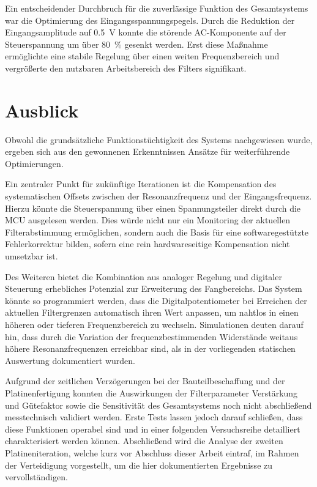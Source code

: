 \documentclass[../main_config.tex]{subfiles}
\begin{document}
Ein entscheidender Durchbruch für die zuverlässige Funktion des Gesamtsystems war die Optimierung des Eingangsspannungspegels. Durch die Reduktion der Eingangsamplitude auf \SI{0,5}{V} konnte die störende AC-Komponente auf der Steuerspannung um über \SI{80}{\percent} gesenkt werden. Erst diese Maßnahme ermöglichte eine stabile Regelung über einen weiten Frequenzbereich und vergrößerte den nutzbaren Arbeitsbereich des Filters signifikant.\par
\medskip



\section{Ausblick}
Obwohl die grundsätzliche Funktionstüchtigkeit des Systems nachgewiesen wurde, ergeben sich aus den gewonnenen Erkenntnissen Ansätze für weiterführende Optimierungen.\par
\medskip

Ein zentraler Punkt für zukünftige Iterationen ist die Kompensation des systematischen Offsets zwischen der Resonanzfrequenz und der Eingangsfrequenz. Hierzu könnte die Steuerspannung über einen Spannungsteiler direkt durch die MCU ausgelesen werden. Dies würde nicht nur ein Monitoring der aktuellen Filterabstimmung ermöglichen, sondern auch die Basis für eine softwaregestützte Fehlerkorrektur bilden, sofern eine rein hardwareseitige Kompensation nicht umsetzbar ist.\par
\medskip

Des Weiteren bietet die Kombination aus analoger Regelung und digitaler Steuerung erhebliches Potenzial zur Erweiterung des Fangbereichs. Das System könnte so programmiert werden, dass die Digitalpotentiometer bei Erreichen der aktuellen Filtergrenzen automatisch ihren Wert anpassen, um nahtlos in einen höheren oder tieferen Frequenzbereich zu wechseln. Simulationen deuten darauf hin, dass durch die Variation der frequenzbestimmenden Widerstände weitaus höhere Resonanzfrequenzen erreichbar sind, als in der vorliegenden statischen Auswertung dokumentiert wurden.\par
\medskip

Aufgrund der zeitlichen Verzögerungen bei der Bauteilbeschaffung und der Platinenfertigung konnten die Auswirkungen der Filterparameter Verstärkung und Gütefaktor sowie die Sensitivität des Gesamtsystems noch nicht abschließend messtechnisch validiert werden. Erste Tests lassen jedoch darauf schließen, dass diese Funktionen operabel sind und in einer folgenden Versuchsreihe detailliert charakterisiert werden können. Abschließend wird die Analyse der zweiten Platineniteration, welche kurz vor Abschluss dieser Arbeit eintraf, im Rahmen der Verteidigung vorgestellt, um die hier dokumentierten Ergebnisse zu vervollständigen.
\end{document}
